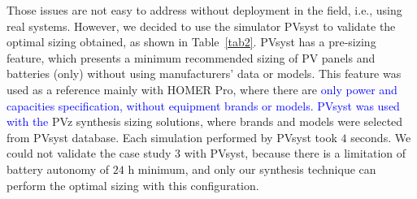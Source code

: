 \documentclass[journal]{IEEEtran}
\begin{document}
Those issues are not easy to address without deployment in the field, i.e., using real systems. However, we decided to use the simulator PVsyst to validate the optimal sizing obtained, as shown in Table~\ref{tab2}. PVsyst has a pre-sizing feature, which presents a minimum recommended sizing of PV panels and batteries (only) without using manufacturers' data or models. This feature was used as a reference mainly with HOMER Pro, where there are \textcolor{blue}{only power and capacities specification, without equipment brands or models. PVsyst was used with the} PVz synthesis sizing solutions, where brands and models were selected from PVsyst database. Each simulation performed by PVsyst took $4$ seconds. We could not validate the case study $3$ with PVsyst, because there is a limitation of battery autonomy of $24$ h minimum, and only our synthesis technique can perform the optimal sizing with this configuration.
%
\end{document}
